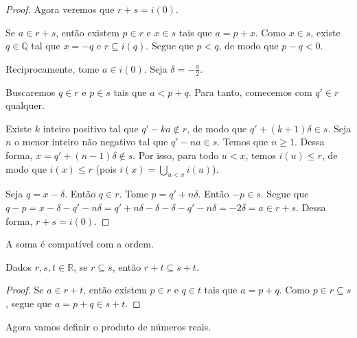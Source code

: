 \begin{proof}
    Agora veremos que $r+s=i(0)$.

    Se $a \in r+s$, então existem $p\in r$ e $x\in s$ tais que $a=p+x$.
    Como $x\in s$, existe $q\in \mathbb Q$ tal que $x=-q$ e $r\subseteq i(q)$.
    Segue que $p<q$, de modo que $p-q<0$.

    Reciprocamente, tome $a \in i(0)$.
    Seja $\delta=-\frac{a}{2}$.

    Buscaremos $q \in r$ e $p\in s$ tais que $a<p+q$.
    Para tanto, comecemos com $q'\in r$ qualquer.
    
    Existe $k$ inteiro positivo tal que $q'-ka\notin r$, de modo que $q'+(k+1)\delta\in s$.
    Seja $n$ o menor inteiro não negativo tal que $q'-na\in s$.
    Temos que $n\geq 1$.
    Dessa forma, $x=q'+(n-1)\delta\notin s$.
    Por isso, para todo $u<x$, temos $i(u)\leq r$, de modo que $i(x)\leq r$ (pois $i(x)=\bigcup_{u<x} i(u)$).

    Seja $q=x-\delta$.
    Então $q \in r$.
    Tome $p=q'+n\delta$.
    Então $-p \in s$.
    Segue que $q-p=x-\delta-q'-n\delta=q'+n\delta-\delta-\delta-q'-n\delta=-2\delta=a\in r+s$.
    Dessa forma, $r+s=i(0)$.
\end{proof}

A soma é compatível com a ordem.

\begin{proposition}
    Dados $r, s, t \in \mathbb R$, se $r\subseteq s$, então $r+t\subseteq s+t$.
\end{proposition}
\begin{proof}
    Se $a \in r+t$, então existem $p\in r$ e $q\in t$ tais que $a=p+q$.
    Como $p\in r\subseteq s$, segue que $a=p+q\in s+t$.
\end{proof}

Agora vamos definir o produto de números reais.

